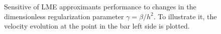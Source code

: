 \documentclass[preprint,12pt,a4paper]{elsarticle}
\begin{document}
\begin{figure}\sidecaption
  \centering
  \caption{Sensitive of LME approximants performance to changes in the
    dimensionless regularization parameter $\gamma = \beta/h^2$. To
    illustrate it, the velocity evolution at the point in the bar left side
    is plotted.}
  \label{fig:Dyka-LME-gamma}
\end{figure}
\end{document}
